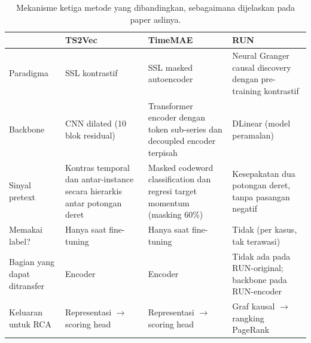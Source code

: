 \begin{table}
\caption{Mekanisme ketiga metode yang dibandingkan, sebagaimana dijelaskan pada paper aslinya.}\label{tab:methods}
\centering
\small
\begin{tabular}{p{1.9cm}p{2.9cm}p{3.1cm}p{3.2cm}}
\toprule
 & TS2Vec \cite{yue2022ts2vec} & TimeMAE \cite{cheng2026timemae} & RUN \cite{lin2024run}\\
\midrule
Paradigma & SSL kontrastif & SSL masked autoencoder & Neural Granger causal discovery dengan pre-training kontrastif\\
Backbone & CNN dilated (10 blok residual) & Transformer encoder dengan token sub-series dan decoupled encoder terpisah & DLinear (model peramalan)\\
Sinyal pretext & Kontras temporal dan antar-instance secara hierarkis antar potongan deret & Masked codeword classification dan regresi target momentum (masking 60\%) & Kesepakatan dua potongan deret, tanpa pasangan negatif\\
Memakai label? & Hanya saat fine-tuning & Hanya saat fine-tuning & Tidak (per kasus, tak terawasi)\\
Bagian yang dapat ditransfer & Encoder & Encoder & Tidak ada pada RUN-original; backbone pada RUN-encoder\\
Keluaran untuk RCA & Representasi $\rightarrow$ scoring head & Representasi $\rightarrow$ scoring head & Graf kausal $\rightarrow$ rangking PageRank\\
\bottomrule
\end{tabular}
\end{table}
